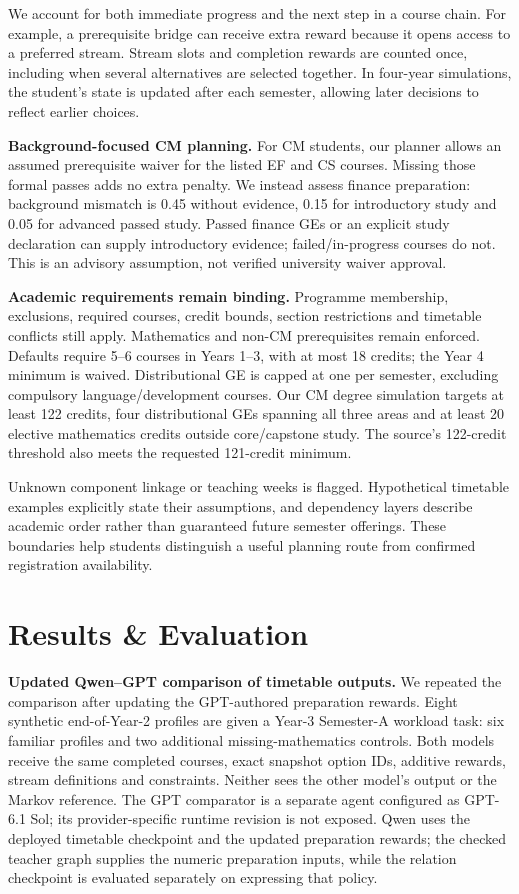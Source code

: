 \documentclass{article}
\begin{document}
We account for both immediate progress and the next step in a course chain. For example, a prerequisite bridge can receive extra reward because it opens access to a preferred stream. Stream slots and completion rewards are counted once, including when several alternatives are selected together. In four-year simulations, the student's state is updated after each semester, allowing later decisions to reflect earlier choices.


\textbf{Background-focused CM planning.} For CM students, our planner allows an assumed prerequisite waiver for the listed EF and CS courses. Missing those formal passes adds no extra penalty. We instead assess finance preparation: background mismatch is 0.45 without evidence, 0.15 for introductory study and 0.05 for advanced passed study. Passed finance GEs or an explicit study declaration can supply introductory evidence; failed/in-progress courses do not. This is an advisory assumption, not verified university waiver approval.

\textbf{Academic requirements remain binding.} Programme membership, exclusions, required courses, credit bounds, section restrictions and timetable conflicts still apply. Mathematics and non-CM prerequisites remain enforced. Defaults require 5--6 courses in Years 1--3, with at most 18 credits; the Year 4 minimum is waived. Distributional GE is capped at one per semester, excluding compulsory language/development courses. Our CM degree simulation targets at least 122 credits, four distributional GEs spanning all three areas and at least 20 elective mathematics credits outside core/capstone study. The source's 122-credit threshold also meets the requested 121-credit minimum.

Unknown component linkage or teaching weeks is flagged. Hypothetical timetable examples explicitly state their assumptions, and dependency layers describe academic order rather than guaranteed future semester offerings. These boundaries help students distinguish a useful planning route from confirmed registration availability.

\newpage
\section{Results \& Evaluation}

\textbf{Updated Qwen--GPT comparison of timetable outputs.} We repeated the comparison after updating the GPT-authored preparation rewards. Eight synthetic end-of-Year-2 profiles are given a Year-3 Semester-A workload task: six familiar profiles and two additional missing-mathematics controls. Both models receive the same completed courses, exact snapshot option IDs, additive rewards, stream definitions and constraints. Neither sees the other model's output or the Markov reference. The GPT comparator is a separate agent configured as GPT-6.1 Sol; its provider-specific runtime revision is not exposed. Qwen uses the deployed timetable checkpoint and the updated preparation rewards; the checked teacher graph supplies the numeric preparation inputs, while the relation checkpoint is evaluated separately on expressing that policy.
\end{document}
